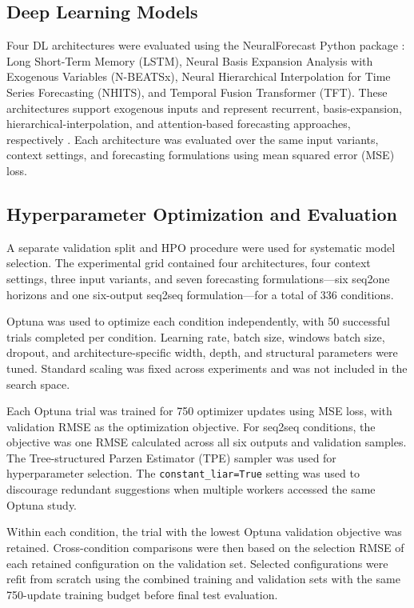 \documentclass[conference]{IEEEtran}
\begin{document}
\subsection{Deep Learning Models}

Four DL architectures were evaluated using the NeuralForecast Python package \cite{olivares2022neuralforecast}: Long Short-Term Memory (LSTM), Neural Basis Expansion Analysis with Exogenous Variables (N-BEATSx), Neural Hierarchical Interpolation for Time Series Forecasting (NHITS), and Temporal Fusion Transformer (TFT). These architectures support exogenous inputs and represent recurrent, basis-expansion, hierarchical-interpolation, and attention-based forecasting approaches, respectively \cite{hochreiter1997lstm,olivares2023nbeatsx,challu2023nhits,lim2021tft}. Each architecture was evaluated over the same input variants, context settings, and forecasting formulations using mean squared error (MSE) loss.


\subsection{Hyperparameter Optimization and Evaluation}

A separate validation split and HPO procedure were used for systematic model selection. The experimental grid contained four architectures, four context settings, three input variants, and seven forecasting formulations---six seq2one horizons and one six-output seq2seq formulation---for a total of 336 conditions.

Optuna \cite{akiba2019optuna} was used to optimize each condition independently, with 50 successful trials completed per condition. Learning rate, batch size, windows batch size, dropout, and architecture-specific width, depth, and structural parameters were tuned. Standard scaling was fixed across experiments and was not included in the search space.

Each Optuna trial was trained for 750 optimizer updates using MSE loss, with validation RMSE as the optimization objective. For seq2seq conditions, the objective was one RMSE calculated across all six outputs and validation samples. The Tree-structured Parzen Estimator (TPE) sampler \cite{bergstra2011tpe} was used for hyperparameter selection. The \texttt{constant\_liar=True} setting was used to discourage redundant suggestions when multiple workers accessed the same Optuna study.

Within each condition, the trial with the lowest Optuna validation objective was retained. Cross-condition comparisons were then based on the selection RMSE of each retained configuration on the validation set. Selected configurations were refit from scratch using the combined training and validation sets with the same 750-update training budget before final test evaluation.
\end{document}
